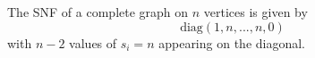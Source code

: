 \begin{theorem}
    The SNF of a complete graph on $n$ vertices is given by $$\text{diag}(1,n,...,n,0)$$ with $n-2$ values of $s_i = n$ appearing on the diagonal.
\end{theorem}